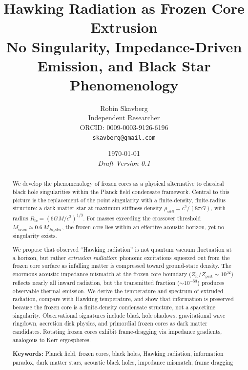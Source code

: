 \documentclass[12pt,a4paper]{article}
\newcommand{\rhostiff}{\rho_\text{stiff}}
\newcommand{\Rfc}{R_\text{fc}}
\newcommand{\Mcross}{M_\text{cross}}
\newcommand{\Zfc}{Z_\text{fc}}
\newcommand{\Zpert}{Z_\text{pert}}
\theoremstyle{definition}
\begin{document}
\title{\textbf{Hawking Radiation as Frozen Core Extrusion}\\[0.5em]
\large No Singularity, Impedance-Driven Emission, and Black Star Phenomenology}
\author{Robin Skavberg\\[0.3em]
\small Independent Researcher\\
\small ORCID: 0009-0003-9126-6196\\
\small \texttt{skavberg@gmail.com}}
\date{\today \\ \vspace{0.5em} \small \textit{Draft Version 0.1}}

\maketitle

\begin{abstract}
\noindent
We develop the phenomenology of frozen cores as a physical alternative to classical black hole singularities within the Planck field condensate framework. Central to this picture is the replacement of the point singularity with a finite-density, finite-radius structure: a dark matter star at maximum stiffness density $\rhostiff = c^2/(8\pi G)$, with radius $\Rfc = (6GM/c^2)^{1/3}$. For masses exceeding the crossover threshold $\Mcross \approx 0.6\,M_\text{Jupiter}$, the frozen core lies within an effective acoustic horizon, yet no singularity exists.

\vspace{0.5em}
\noindent
We propose that observed ``Hawking radiation'' is not quantum vacuum fluctuation at a horizon, but rather \emph{extrusion radiation}: phononic excitations squeezed out from the frozen core surface as infalling matter is compressed toward ground-state density. The enormous acoustic impedance mismatch at the frozen core boundary ($\Zfc/\Zpert \sim 10^{52}$) reflects nearly all inward radiation, but the transmitted fraction ($\sim 10^{-53}$) produces observable thermal emission. We derive the temperature and spectrum of extruded radiation, compare with Hawking temperature, and show that information is preserved because the frozen core is a finite-density condensate structure, not a spacetime singularity. Observational signatures include black hole shadows, gravitational wave ringdown, accretion disk physics, and primordial frozen cores as dark matter candidates. Rotating frozen cores exhibit frame-dragging via impedance gradients, analogous to Kerr ergospheres.

\vspace{0.5em}
\noindent
\textbf{Keywords:} Planck field, frozen cores, black holes, Hawking radiation, information paradox, dark matter stars, acoustic black holes, impedance mismatch, frame dragging
\end{abstract}
\end{document}
